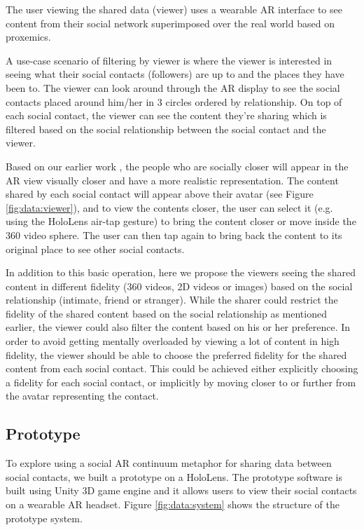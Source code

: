 The user viewing the shared data (viewer) uses a wearable AR interface to see content from their social network superimposed over the real world based on proxemics. 

A use-case scenario of filtering by viewer is where the viewer is interested in seeing what their social contacts (followers) are up to and the places they have been to. The viewer can look around through the AR display to see the social contacts placed around him/her in 3 circles ordered by relationship. On top of each social contact, the viewer can see the content they're sharing which is filtered based on the social relationship between the social contact and the viewer.

Based on our earlier work \cite{Nassani2017a}, the people who are socially closer will appear in the AR view visually closer and have a more realistic representation. The content shared by each social contact will appear above their avatar (see Figure \ref{fig:data:viewer}), and to view the contents closer, the user can select it (e.g. using the HoloLens air-tap gesture) to bring the content closer or move inside the 360 video sphere. The user can then tap again to bring back the content to its original place to see other social contacts. 

In addition to this basic operation, here we propose the viewers seeing the shared content in different fidelity (360 videos, 2D videos or images) based on the social relationship (intimate, friend or stranger). While the sharer could restrict the fidelity of the shared content based on the social relationship as mentioned earlier, the viewer could also filter the content based on his or her preference. In order to avoid getting mentally overloaded by viewing a lot of content in high fidelity, the viewer should be able to choose the preferred fidelity for the shared content from each social contact. This could be achieved either explicitly choosing a fidelity for each social contact, or implicitly by moving closer to or further from the avatar representing the contact.      

\subsection{Prototype}

To explore using a social AR continuum metaphor for sharing data between social contacts, we built a prototype on a HoloLens. The prototype software is built using Unity 3D game engine and it allows users to view their social contacts on a wearable AR headset. Figure \ref{fig:data:system} shows the structure of the prototype system. 

